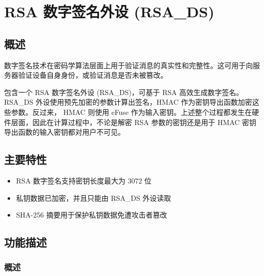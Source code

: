 \documentclass[main\_\_CN.tex]{subfiles}
\begin{document}

\ifglobal
\else
    {\let\clearpage\relax \listoftodos}
    \tableofcontents
\fi




\chapter{RSA 数字签名外设 (RSA\_DS)}
\label{mod:digsig}
\hypertarget{digsig}{}\hypertarget{rsads}{}


\section{概述}

数字签名技术在密码学算法层面上用于验证消息的真实性和完整性。这可用于向服务器验证设备自身身份，或验证消息是否未被篡改。

\chipname{} 包含一个 RSA 数字签名外设 (RSA\_DS)，可基于 RSA 高效生成数字签名。RSA\_DS 外设使用预先加密的参数计算出签名，HMAC 作为密钥导出函数加密这些参数。反过来， HMAC 则使用 eFuse 作为输入密钥。上述整个过程都发生在硬件层面，因此在计算过程中，不论是解密 RSA 参数的密钥还是用于 HMAC 密钥导出函数的输入密钥都对用户不可见。

\section{主要特性}

\begin{itemize}
\item RSA 数字签名支持密钥长度最大为 3072 位
\item 私钥数据已加密，并且只能由 RSA\_DS 外设读取
\item SHA-256 摘要用于保护私钥数据免遭攻击者篡改
\end{itemize}


\section{功能描述}
\subsection{概述}
\end{document}
